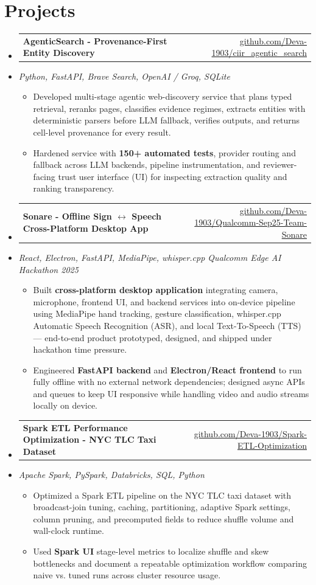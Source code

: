 \documentclass[letterpaper,10pt]{article}
\makeatletter
\newcommand{\resumeItem}[1]{
  \item\small{#1\vspace{-1pt}}
}
\newcommand{\resumeProjectHeading}[2]{
    \item
    \begin{tabular*}{0.985\textwidth}[t]{l@{\extracolsep{\fill}}r}
      \small\textbf{#1} & \small #2 \\
    \end{tabular*}\vspace{-5pt}
}
\newcommand{\resumeProjectSubheading}[1]{
  \vspace{-2pt}\item[] {\small\textcolor{ResumeSlate}{\emph{#1}}}\vspace{-3pt}
}
\newcommand{\resumeSubHeadingListStart}{\begin{itemize}[leftmargin=0.0in, label={}, itemsep=2pt, topsep=2pt]}
\newcommand{\resumeSubHeadingListEnd}{\end{itemize}}
\newcommand{\resumeItemListStart}{\begin{itemize}[leftmargin=0.18in, itemsep=2pt, topsep=1pt]}
\newcommand{\resumeItemListEnd}{\end{itemize}\vspace{-4pt}}
\makeatother
\begin{document}
\section{Projects}
\resumeSubHeadingListStart
  \resumeProjectHeading
    {AgenticSearch - Provenance-First Entity Discovery}
    {\href{https://github.com/Deva-1903/ciir_agentic_search}{github.com/Deva-1903/ciir\_agentic\_search}}
  \resumeProjectSubheading{Python, FastAPI, Brave Search, OpenAI / Groq, SQLite}
    \resumeItemListStart
      \resumeItem{Developed multi-stage agentic web-discovery service that plans typed retrieval, reranks pages, classifies evidence regimes, extracts entities with deterministic parsers before LLM fallback, verifies outputs, and returns cell-level provenance for every result.}
      \resumeItem{Hardened service with \textbf{150+ automated tests}, provider routing and fallback across LLM backends, pipeline instrumentation, and reviewer-facing trust user interface (UI) for inspecting extraction quality and ranking transparency.}
    \resumeItemListEnd
  \resumeProjectHeading
    {Sonare - Offline Sign \(\leftrightarrow\) Speech Cross-Platform Desktop App}
    {\href{https://github.com/Deva-1903/Qualcomm-Sep25-Team-Sonare}{github.com/Deva-1903/Qualcomm-Sep25-Team-Sonare}}
  \resumeProjectSubheading{React, Electron, FastAPI, MediaPipe, whisper.cpp \enspace\textbar\enspace Qualcomm Edge AI Hackathon 2025}
    \resumeItemListStart
      \resumeItem{Built \textbf{cross-platform desktop application} integrating camera, microphone, frontend UI, and backend services into on-device pipeline using MediaPipe hand tracking, gesture classification, whisper.cpp Automatic Speech Recognition (ASR), and local Text-To-Speech (TTS) --- end-to-end product prototyped, designed, and shipped under hackathon time pressure.}
      \resumeItem{Engineered \textbf{FastAPI backend} and \textbf{Electron/React frontend} to run fully offline with no external network dependencies; designed async APIs and queues to keep UI responsive while handling video and audio streams locally on device.}
    \resumeItemListEnd
  \resumeProjectHeading
    {Spark ETL Performance Optimization - NYC TLC Taxi Dataset}
    {\href{https://github.com/Deva-1903/Spark-ETL-Optimization}{github.com/Deva-1903/Spark-ETL-Optimization}}
  \resumeProjectSubheading{Apache Spark, PySpark, Databricks, SQL, Python}
    \resumeItemListStart
      \resumeItem{Optimized a Spark ETL pipeline on the NYC TLC taxi dataset with broadcast-join tuning, caching, partitioning, adaptive Spark settings, column pruning, and precomputed fields to reduce shuffle volume and wall-clock runtime.}
      \resumeItem{Used \textbf{Spark UI} stage-level metrics to localize shuffle and skew bottlenecks and document a repeatable optimization workflow comparing naive vs. tuned runs across cluster resource usage.}
    \resumeItemListEnd
\resumeSubHeadingListEnd
\vspace{-4pt}
\end{document}
